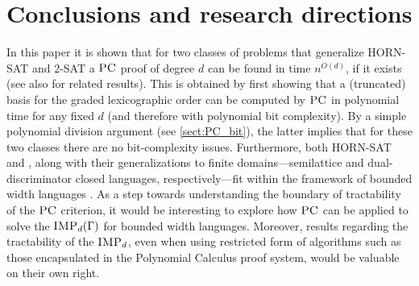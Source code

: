 \documentclass[11pt]{article}
\newcommand{\IMP}{\textsc{IMP}}
\newcommand{\PC}{\textsc{PC}}
\newcommand{\1}{\textbf{1}}
\newcommand{\GB}{\text{Gr\"{o}bner} }
\begin{document}
\section{Conclusions and research directions}\label{sect:open problem}






In this paper it is shown that for two classes of problems that generalize \textsc{HORN-SAT} and \textsc{2-SAT} a $\PC$ proof of degree $d$ can be found in time $n^{O(d)}$, if it exists (see also \cite{BharathiM21} for related results). This is obtained by first showing that a (truncated) \GB basis for the graded lexicographic order can be computed by $\PC$ in polynomial time for any fixed $d$ (and therefore with polynomial bit complexity). By a simple polynomial division argument (see \cref{sect:PC_bit}), the latter implies that for these two classes there are no bit-complexity issues. Furthermore, both \textsc{HORN-SAT} and , along with their generalizations to finite domains---semilattice and dual-discriminator closed languages, respectively---fit within the framework of bounded width languages \cite{JEAVONS_TRACTABLE_CONSTRAINTS}. As a step towards understanding the boundary of tractability of the $\PC$ criterion, it would be interesting to explore how $\PC$ can be applied to solve the $\IMP_d(\Gamma)$ for bounded width languages. Moreover, results regarding the tractability of the $\IMP_d$, even when using restricted form of algorithms such as those encapsulated in the Polynomial Calculus proof system, would be valuable on their own right.
\end{document}
